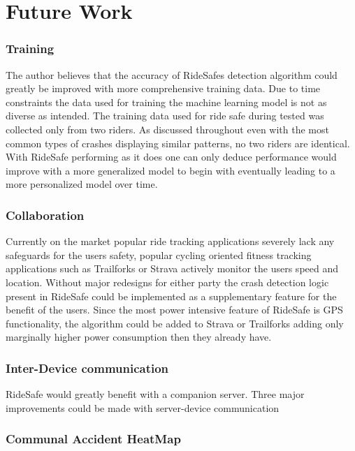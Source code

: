 \chapter {Future Work}

\subsection {Training}

The author believes that the accuracy of RideSafes detection algorithm could greatly be improved with more comprehensive training data. Due to time constraints the data used for training the machine learning model is not as diverse as intended. The training data used for ride safe during tested was collected only from two riders. As discussed throughout even with the most common types of crashes displaying similar patterns, no two riders are identical.   With RideSafe performing as it does one can only deduce performance would improve with a more generalized model to begin with eventually leading to a more personalized model over time.





\subsection {Collaboration}

Currently on the market popular ride tracking applications severely lack  any safeguards for the users safety, popular cycling oriented fitness tracking applications such as Trailforks or Strava actively monitor the users speed and location. Without major redesigns for either party the crash detection logic present in RideSafe could be implemented as a supplementary feature for the benefit of the users. Since the most power intensive feature of RideSafe is GPS functionality, the algorithm could be added to Strava or Trailforks adding only marginally higher power consumption then they already have.




\subsection {Inter-Device communication}
RideSafe would greatly benefit with a companion server. Three major improvements could be made with server-device communication 


\subsection *{Communal Accident HeatMap}


